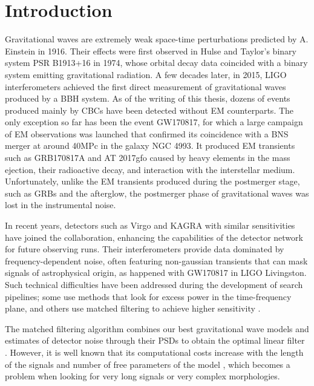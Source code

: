 

\chapter*{Introduction}
Gravitational waves are extremely weak space-time perturbations predicted by A. Einstein in 1916\cite{Einstein:1916cc}. Their effects were first observed in Hulse and Taylor's binary system PSR B1913+16 in 1974, whose orbital decay data coincided with a binary system emitting gravitational radiation\cite{Weisberg:1981mt}. A few decades later, in 2015, LIGO interferometers achieved the first direct measurement of gravitational waves produced by a BBH system\cite{LIGOScientific:2016aoc}. As of the writing of this thesis, dozens of events produced mainly by CBCs have been detected without EM counterparts. The only exception so far has been the event GW170817\cite{LIGOScientific:2017vwq}, for which a large campaign of EM observations was launched that confirmed its coincidence with a BNS merger at around 40MPc in the galaxy NGC 4993. It produced EM transients such as GRB170817A and AT 2017gfo caused by heavy elements in the mass ejection, their radioactive decay, and interaction with the interstellar medium\cite{Abbott_2017, LIGOScientific:2017ync, 10.1093/mnras/stz1564}. Unfortunately, unlike the EM transients produced during the postmerger stage, such as GRBs and the afterglow, the postmerger phase of gravitational waves was lost in the instrumental noise\cite{LIGOScientific:2018hze, LIGOScientific:2018urg, LIGOScientific:2017fdd}. 

In recent years, detectors such as Virgo and KAGRA with similar sensitivities have joined the collaboration, enhancing the capabilities of the detector network for future observing runs. Their interferometers provide data dominated by frequency-dependent noise, often featuring non-gaussian transients that can mask signals of astrophysical origin, as happened with GW170817 in LIGO Livingston\cite{LIGOScientific:2017vwq}. Such technical difficulties have been addressed during the development of search pipelines; some use methods that look for excess power in the time-frequency plane\cite{Drago:2020kic}, and others use matched filtering to achieve higher sensitivity \cite{Usman:2015kfa, Sachdev:2019vvd, Aubin:2020goo}.  

The matched filtering algorithm combines our best gravitational wave models and estimates of detector noise through their PSDs to obtain the optimal linear filter \cite{Creighton:2011zz, Wainstein:1962vrq}. However, it is well known that its computational costs increase with the length of the signals and number of free parameters of the model \cite{Allen_2021, Dhurkunde:2021csz}, which becomes a problem when looking for very long signals \cite{Sathyaprakash:2009xs} or very complex morphologies.

